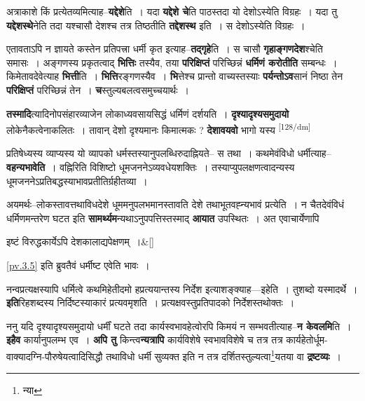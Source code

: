 \documentclass[article,12pt,a4paper]{memoir}
\begin{document}
	  \pstart अत्राकाशे किं प्रत्येतव्यमित्याह--\textbf{यद्देशे}ति । यदा \textbf{यद्देशे चे}ति पाठस्तदा यो देशोऽस्येति विग्रहः । यदा तु \textbf{यद्देशस्थे}नेति तदा यश्चासौ देशश्च तत्र तिष्ठतीति \textbf{तद्देशस्थ} इति । स देशोऽस्येति विग्रहः ।
	\pend
      

	  \pstart एतावताऽपि न ज्ञायते कस्तेन प्रतिपत्त्रा धर्मी कृत इत्याह--\textbf{तद्गृहे}ति । स चासौ \textbf{गृहाङ्गणदेश}श्चेति समासः । अङ्गणस्य प्रकृतत्वाद् \textbf{भित्तिः} तस्यैव, तया \textbf{परिक्षिप्तं} परिच्छिन्नं \textbf{धर्मिणं करोतीति} सम्बन्धः । किमेतावदेवेत्याह \textbf{भित्ती}ति । \textbf{भित्ति}रङ्गणस्यैव । \textbf{भि}त्तेश्च प्रान्तो वाच्यस्तस्याः \textbf{पर्यन्तोऽव}सानं निष्ठा तेन \textbf{परिक्षिप्तं} परिच्छिन्नं तेन । \textbf{च}स्तुल्यबलत्वसमुच्चयार्थः ।
	\pend
      

	  \pstart \textbf{तस्मादि}त्यादिनोपसंहारव्याजेन लोकाध्यवसायसिद्धं धर्मिणं दर्शयति । \textbf{दृश्यादृश्यसमुदायो} लोकेनैकत्वेनाकलितः । तावान् देशो दृश्यमानः किमात्मकः ? \textbf{देशावयवो} भागो यस्य  \leavevmode\textsuperscript{\rmlatinfont\tiny [128/dm]} 
	  
	प्रतिषेध्यस्य व्याप्यस्य यो व्यापको धर्मस्तस्यानुपलब्धिरुदाह्नियते-- स तथा । कथमेवंविधो धर्मीत्याह--\textbf{वहन्यभावेति} । वह्निरिति विशिष्टो धूमजननेऽव्यवधेयशक्तिः । तस्याप्युपलक्षणत्वादन्यस्य धूमजननेऽप्रतिबद्धस्याभावप्रतीतिर्ग्रहीतव्या ।
	\pend
      

	  \pstart अयमर्थः--लोकस्तावत्तथाविधदेशे धूममनुपलभमानस्तावति देशे तथाभूतवह्न्यभावं प्रत्येति । न चैतदेवंविधं धर्मिणमन्तरेण घटत इति \textbf{सामर्थ्यम}न्यथाऽनुपपत्तिस्तस्माद् \textbf{आयात} उपस्थितः । अत एवाचार्येणापि 
	    \pend
	  
	    
	    \stanza[\smallbreak]
इष्टं विरुद्धकार्येऽपि देशकालाद्यपेक्षणम् ।\&[\smallbreak]


	
	    \pstart
	   \cref{pv.3.5} इति ब्रुवतैवं धर्मीष्ट एवेति भावः ।
	\pend
      

	  \pstart नन्वप्रत्यक्षस्यापि धर्मित्वे कथमिहेतीदमो हप्रत्ययान्तस्य निर्देश इत्याशङ्क्याह—इहेति । तुशब्दो यस्मादर्थे । \textbf{इति}रिहशब्दस्य निर्दिष्टस्याकारं प्रत्यवमृशति । प्रत्यक्षवस्तुप्रतिपादको निर्देशस्तथोक्तः ।
	\pend
      

	  \pstart ननु यदि दृश्यादृश्यसमुदायो धर्मीं घटते तदा कार्यस्वभावहेत्वोरपि किमयं न सम्भवतीत्याह--\textbf{न केवलमि}ति । \textbf{इहैव} कार्यानुपलम्भ एव । \textbf{अपि तु} किन्त्व\textbf{न्यत्रापि} कार्यविशेषे स्वभावविशेषे च तत्र तत्र कार्यहेतोर्धूम-वाक्यादग्नि-पौरुषेयत्वादिसिद्धौ तथाविधो धर्मी सुव्यक्त इति न तत्र दर्शितस्तुल्यत्वा\footnote{न्या}यतया वा \textbf{द्रष्टव्यः} ।
	\pend
      
\end{document}
